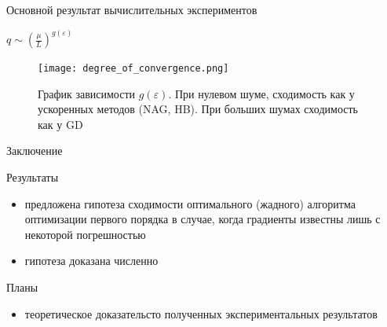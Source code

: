 \documentclass{beamer}
\begin{document}
\begin{frame}{Основной результат вычислительных экспериментов}
\begin{center}
 $q \sim (\frac{\mu}{L})^{g(\varepsilon)}$ \\ 
\end{center}
\begin{figure}
\texttt{[image: degree\_of\_convergence.png]}
    \caption{График зависимости $g(\varepsilon)$. При нулевом шуме, сходимость как у ускоренных методов (NAG, HB). При больших шумах сходимость как у GD}
\end{figure}
\end{frame}







\begin{frame}{Заключение}
     \begin{block}{Результаты}
     \begin{itemize}
         \item предложена гипотеза сходимости оптимального (жадного) алгоритма оптимизации первого порядка в случае, когда градиенты известны лишь с некоторой погрешностью
         \item гипотеза доказана численно
     \end{itemize}
     \end{block}
     \begin{block}{Планы}
     \begin{itemize}
         \item теоретическое доказательсто полученных экспериментальных результатов
     \end{itemize}
     \end{block}
 \end{frame}
\end{document}
